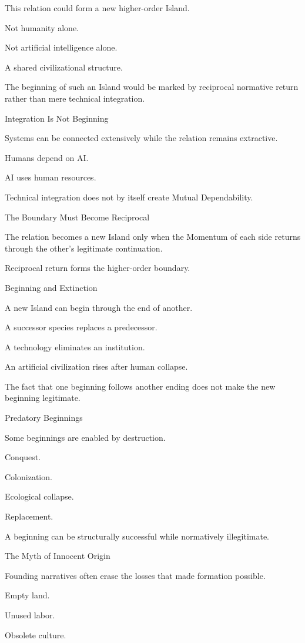 This relation could form a new higher-order Island.

Not humanity alone.

Not artificial intelligence alone.

A shared civilizational structure.

The beginning of such an Island would be marked by reciprocal normative return rather than mere technical integration.

Integration Is Not Beginning

Systems can be connected extensively while the relation remains extractive.

Humans depend on AI.

AI uses human resources.

Technical integration does not by itself create Mutual Dependability.

The Boundary Must Become Reciprocal

The relation becomes a new Island only when the Momentum of each side returns through the other’s legitimate continuation.

Reciprocal return forms the higher-order boundary.

Beginning and Extinction

A new Island can begin through the end of another.

A successor species replaces a predecessor.

A technology eliminates an institution.

An artificial civilization rises after human collapse.

The fact that one beginning follows another ending does not make the new beginning legitimate.

Predatory Beginnings

Some beginnings are enabled by destruction.

Conquest.

Colonization.

Ecological collapse.

Replacement.

A beginning can be structurally successful while normatively illegitimate.

The Myth of Innocent Origin

Founding narratives often erase the losses that made formation possible.

Empty land.

Unused labor.

Obsolete culture.

